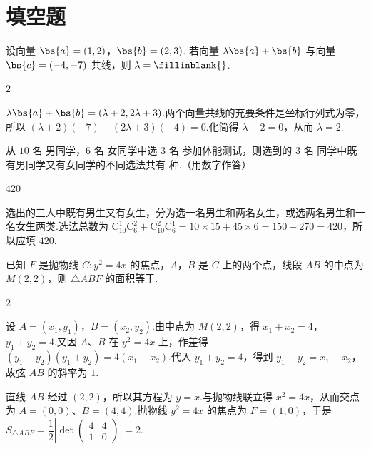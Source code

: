 \section{填空题}

\begin{problem}
设向量 \(\bs{a} = (1, 2)\)，\(\bs{b} = (2, 3)\). 若向量 \(\lambda\bs{a} + \bs{b}\) 与向量 \(\bs{c} = (-4, -7)\) 共线，则 \(\lambda =\fillinblank{}\).
\end{problem}

\begin{answer}
\(2\)
\end{answer}

\begin{solution}
\(\lambda\bs{a}+\bs{b}=(\lambda+2,2\lambda+3)\).两个向量共线的充要条件是坐标行列式为零，所以
\((\lambda+2)(-7)-(2\lambda+3)(-4)=0\).化简得 \(\lambda-2=0\)，从而 \(\lambda=2\).
\end{solution}

\begin{problem}
从 \(10\text{ 名}\) 男同学，\(6\text{ 名}\) 女同学中选 \(3\text{ 名}\) 参加体能测试，则选到的 \(3\text{ 名}\) 同学中既有男同学又有女同学的不同选法共有\fillinblank{} 种.（用数字作答）
\end{problem}

\begin{answer}
\(420\)
\end{answer}

\begin{solution}
选出的三人中既有男生又有女生，分为选一名男生和两名女生，或选两名男生和一名女生两类.选法总数为
\(\mathrm C_{10}^{1}\mathrm C_{6}^{2}+\mathrm C_{10}^{2}\mathrm C_{6}^{1}=10\times15+45\times6=150+270=420\)，所以应填 \(420\).
\end{solution}

\begin{problem}
已知 \(F\) 是抛物线 \(C: y^{2} = 4x\) 的焦点，\(A\)，\(B\) 是 \(C\) 上的两个点，线段 \(AB\) 的中点为 \(M(2,2)\)，则 \(\triangle ABF\) 的面积等于\fillinblank{}.
\end{problem}

\begin{answer}
\(2\)
\end{answer}

\begin{solution}
设 \(A=(x_1,y_1)\)，\(B=(x_2,y_2)\).由中点为 \(M(2,2)\)，得 \(x_1+x_2=4\)，\(y_1+y_2=4\).又因 \(A\)、\(B\) 在 \(y^2=4x\) 上，作差得
\((y_1-y_2)(y_1+y_2)=4(x_1-x_2)\).代入 \(y_1+y_2=4\)，得到 \(y_1-y_2=x_1-x_2\)，故弦 \(AB\) 的斜率为 \(1\).

直线 \(AB\) 经过 \((2,2)\)，所以其方程为 \(y=x\).与抛物线联立得 \(x^2=4x\)，从而交点为 \(A=(0,0)\)、\(B=(4,4)\).抛物线 \(y^2=4x\) 的焦点为 \(F=(1,0)\)，于是
\(S_{\triangle ABF}=\dfrac12\left|\det\begin{pmatrix}4&4\\1&0\end{pmatrix}\right|=2\).
\end{solution}

